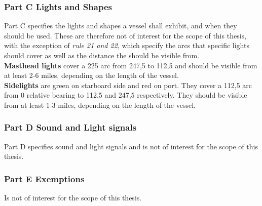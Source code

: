 \subsubsection{Part C Lights and Shapes}
Part C specifies the lights and shapes a vessel shall exhibit, and when they should be used. These are therefore not of interest for the scope of this thesis, with the exception of \textit{rule 21 and 22}, which specify the arcs that specific lights should cover as well as the distance the should be visible from.
\\
\textbf{Masthead lights} cover a 225 \textdegree arc from 247,5 \textdegree to 112,5 \textdegree and should be visible from at least 2-6 miles, depending on the length of the vessel.\\
\textbf{Sidelights} are green on starboard side and red on port. They cover a 112,5 arc from 0 relative bearing to 112,5 and 247,5 respectively. They should be visible from at least 1-3 miles, depending on the length of the vessel.
\subsubsection{Part D Sound and Light signals}
Part D specifies sound and light signals and is not of interest for the scope of this thesis.
\subsubsection{Part E Exemptions}
Is not of interest for the scope of this thesis.
